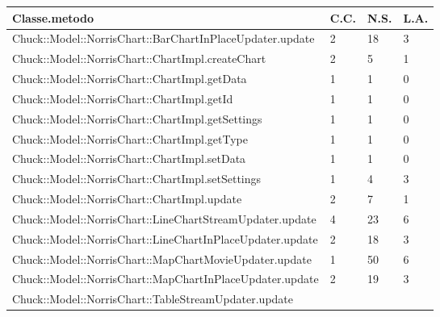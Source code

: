 
				\begin{longtabu} spread 1cm [c]{|p{11cm}|p{1cm}|p{1cm}|p{1cm}|}
	\hline
					\rowfont{\bf \centering}
					Classe.metodo &
					C.C. &
					N.S.  &
					L.A. \\
					\hline
					\endhead
            
					\parbox[t]{4cm}{Chuck::Model::NorrisChart::BarChartInPlaceUpdater.update} &
                2 &
                18 &
                3\\\hline \parbox[t]{4cm}{Chuck::Model::NorrisChart::ChartImpl.createChart} &
                2 &
                5 &
                1\\\hline \parbox[t]{4cm}{Chuck::Model::NorrisChart::ChartImpl.getData} &
                1 &
                1 &
                0\\\hline \parbox[t]{4cm}{Chuck::Model::NorrisChart::ChartImpl.getId} &
                1 &
                1 &
                0\\\hline \parbox[t]{4cm}{Chuck::Model::NorrisChart::ChartImpl.getSettings} &
                1 &
                1 &
                0\\\hline \parbox[t]{4cm}{Chuck::Model::NorrisChart::ChartImpl.getType} &
                1 &
                1 &
                0\\\hline \parbox[t]{4cm}{Chuck::Model::NorrisChart::ChartImpl.setData} &
                1 &
                1 &
                0\\\hline \parbox[t]{4cm}{Chuck::Model::NorrisChart::ChartImpl.setSettings} &
                1 &
                4 &
                3\\\hline \parbox[t]{4cm}{Chuck::Model::NorrisChart::ChartImpl.update} &
                2 &
                7 &
                1\\\hline \parbox[t]{4cm}{Chuck::Model::NorrisChart::LineChartStreamUpdater.update} &
                4 &
                23 &
                6\\\hline \parbox[t]{4cm}{Chuck::Model::NorrisChart::LineChartInPlaceUpdater.update} &
                2 &
                18 &
                3\\\hline \parbox[t]{4cm}{Chuck::Model::NorrisChart::MapChartMovieUpdater.update} &
                1 &
                50 &
                6\\\hline \parbox[t]{4cm}{Chuck::Model::NorrisChart::MapChartInPlaceUpdater.update} &
                2 &
                19 &
                3\\\hline \parbox[t]{4cm}{Chuck::Model::NorrisChart::TableStreamUpdater.update} &

\end{longtabu}
